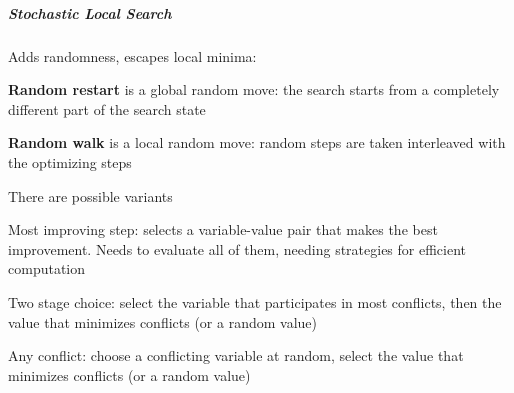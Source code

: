 \documentclass[10pt]{report}
\begin{document}
\subparagraph{Stochastic Local Search} Adds randomness, escapes local minima:\begin{list}{}{}
	\item \textbf{Random restart} is a global random move: the search starts from a completely different part of the search state
	\item \textbf{Random walk} is a local random move: random steps are taken interleaved with the optimizing steps
\end{list}
There are possible variants \begin{list}{}{}
	\item Most improving step: selects a variable-value pair that makes the best improvement. Needs to evaluate all of them, needing strategies for efficient computation
	\item Two stage choice: select the variable that participates in most conflicts, then the value that minimizes conflicts (or a random value)
	\item Any conflict: choose a conflicting variable at random, select the value that minimizes conflicts (or a random value)
\end{list}
\end{document}
